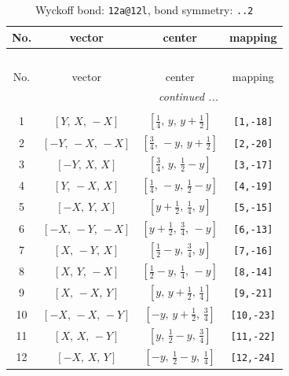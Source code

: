 \documentclass[fleqn,8pt]{jsarticle}
\begin{document}
\begin{longtable}{cccc}
\caption{Wyckoff bond: {\tt 12a@12l}, bond symmetry: {\tt ..2}}
 \\
 \hline \hline
No. & vector & center & mapping \\ \hline \endfirsthead

\multicolumn{3}{l}{\tablename\ \thetable{}} \\
 \hline \hline
No. & vector & center & mapping \\ \hline \endhead

 \hline \hline
\multicolumn{3}{r}{\footnotesize\it continued ...} \\ \endfoot

 \hline \hline
\multicolumn{3}{r}{} \\ \endlastfoot

1 & $\left[ Y,\, X,\, - X \right]$ & $\left[ \frac{1}{4},\, y,\, y + \frac{1}{2} \right]$ & {\tt [1,-18]} \\ \hline
2 & $\left[ - Y,\, - X,\, - X \right]$ & $\left[ \frac{3}{4},\, - y,\, y + \frac{1}{2} \right]$ & {\tt [2,-20]} \\ \hline
3 & $\left[ - Y,\, X,\, X \right]$ & $\left[ \frac{3}{4},\, y,\, \frac{1}{2} - y \right]$ & {\tt [3,-17]} \\ \hline
4 & $\left[ Y,\, - X,\, X \right]$ & $\left[ \frac{1}{4},\, - y,\, \frac{1}{2} - y \right]$ & {\tt [4,-19]} \\ \hline
5 & $\left[ - X,\, Y,\, X \right]$ & $\left[ y + \frac{1}{2},\, \frac{1}{4},\, y \right]$ & {\tt [5,-15]} \\ \hline
6 & $\left[ - X,\, - Y,\, - X \right]$ & $\left[ y + \frac{1}{2},\, \frac{3}{4},\, - y \right]$ & {\tt [6,-13]} \\ \hline
7 & $\left[ X,\, - Y,\, X \right]$ & $\left[ \frac{1}{2} - y,\, \frac{3}{4},\, y \right]$ & {\tt [7,-16]} \\ \hline
8 & $\left[ X,\, Y,\, - X \right]$ & $\left[ \frac{1}{2} - y,\, \frac{1}{4},\, - y \right]$ & {\tt [8,-14]} \\ \hline
9 & $\left[ X,\, - X,\, Y \right]$ & $\left[ y,\, y + \frac{1}{2},\, \frac{1}{4} \right]$ & {\tt [9,-21]} \\ \hline
10 & $\left[ - X,\, - X,\, - Y \right]$ & $\left[ - y,\, y + \frac{1}{2},\, \frac{3}{4} \right]$ & {\tt [10,-23]} \\ \hline
11 & $\left[ X,\, X,\, - Y \right]$ & $\left[ y,\, \frac{1}{2} - y,\, \frac{3}{4} \right]$ & {\tt [11,-22]} \\ \hline
12 & $\left[ - X,\, X,\, Y \right]$ & $\left[ - y,\, \frac{1}{2} - y,\, \frac{1}{4} \right]$ & {\tt [12,-24]} \\
\end{longtable}
\end{document}
